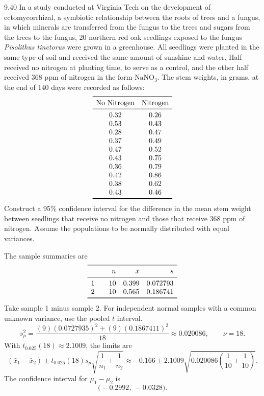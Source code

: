 \documentclass[11pt,oneside]{article}
\begin{document}
\begin{exercise}{9.40}
In a study conducted at Virginia Tech on the development of ectomycorrhizal, a symbiotic relationship between the roots of trees and a fungus, in which minerals are transferred from the fungus to the trees and sugars from the trees to the fungus, 20 northern red oak seedlings exposed to the fungus \textit{Pisolithus tinctorus} were grown in a greenhouse. All seedlings were planted in the same type of soil and received the same amount of sunshine and water. Half received no nitrogen at planting time, to serve as a control, and the other half received 368 ppm of nitrogen in the form $\mathrm{NaNO_3}$. The stem weights, in grams, at the end of 140 days were recorded as follows:
\[
\begin{array}{cc}\toprule
\text{No Nitrogen} & \text{Nitrogen}\\\midrule
0.32 & 0.26\\
0.53 & 0.43\\
0.28 & 0.47\\
0.37 & 0.49\\
0.47 & 0.52\\
0.43 & 0.75\\
0.36 & 0.79\\
0.42 & 0.86\\
0.38 & 0.62\\
0.43 & 0.46\\
\bottomrule\end{array}
\]
Construct a 95\% confidence interval for the difference in the mean stem weight between seedlings that receive no nitrogen and those that receive 368 ppm of nitrogen. Assume the populations to be normally distributed with equal variances.
\end{exercise}
\begin{solution}
The sample summaries are
\[
\begin{array}{c@{\qquad}rrr}\toprule &n&\bar x&s\\\midrule 1&10&0.399&0.072793\\2&10&0.565&0.186741\\\bottomrule\end{array}
\]
Take sample 1 minus sample 2. For independent normal samples with a common unknown variance, use the pooled $t$ interval.
\[
s_p^2=\frac{(9)(0.0727935)^2+(9)(0.1867411)^2}{18}\approx0.020086,\qquad \nu=18.
\]
 With $t_{0.025}(18)\approx2.1009$, the limits are
\[
(\bar x_1-\bar x_2)\pm t_{0.025}(18)s_p\sqrt{\frac1{n_1}+\frac1{n_2}}\approx -0.166\pm 2.1009\sqrt{0.020086\left(\frac1{10}+\frac1{10}\right)}.
\]
The confidence interval for $\mu_1-\mu_2$ is 
\[
\boxed{\bigl(-0.2992,\ -0.0328\bigr)}.
\]
\end{solution}
\end{document}
